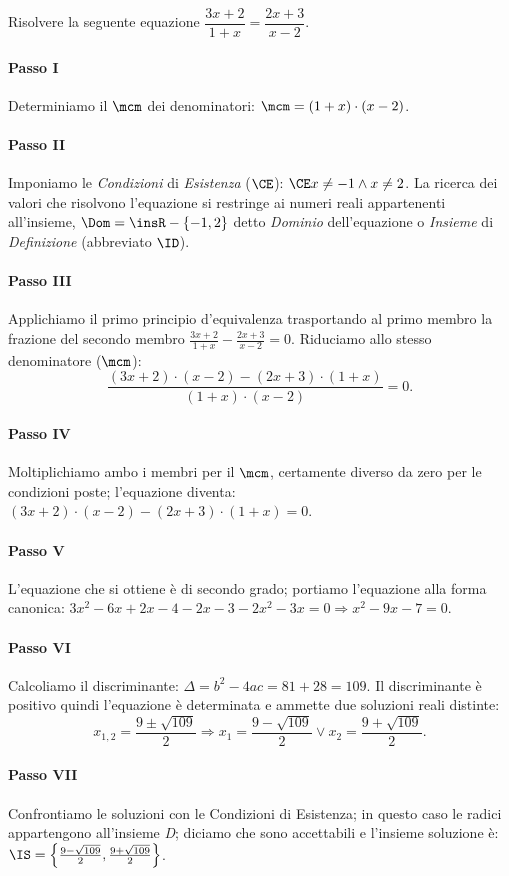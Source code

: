 \begin{esempio}
Risolvere la seguente equazione $\dfrac{3 x + 2}{1 + x}=\dfrac{2 x + 3}{x - 2}$.
 \paragraph{Passo I} Determiniamo il $\mcm$ dei denominatori: $\mcm = ( 1 + x ) 
\cdot ( x - 2 )$.
 \paragraph{Passo II} Imponiamo le \emph{Condizioni} di \emph{Esistenza} 
($\CE$): $\CE x \neq - 1 \wedge x \neq 2$. La ricerca dei valori che risolvono 
l'equazione si restringe ai numeri reali appartenenti all'insieme, $\Dom = 
\insR 
- \{- 1, 2 \}$ detto \emph{Dominio} dell'equazione o \emph{Insieme} di 
\emph{Definizione} (abbreviato $\ID$).
 \paragraph{Passo III} Applichiamo il primo principio d'equivalenza 
trasportando 
al primo membro la frazione del secondo membro $\frac{3 x + 2}{1 + x} - \frac{2 
x + 3}{x - 2} = 0$. Riduciamo allo stesso denominatore ($\mcm$): 
\[\frac{( 3 x + 2 ) \cdot ( x - 2 ) - ( 2 x + 3 ) \cdot ( 1 + x )}{( 1 +x ) 
\cdot ( x - 2 )}=0.\]
 \paragraph{Passo IV} Moltiplichiamo ambo i membri per il $\mcm$, certamente 
diverso da zero per le condizioni poste; l'equazione diventa: $( 3 x + 2 ) 
\cdot 
( x - 2 ) - ( 2 x + 3 ) \cdot ( 1 + x )=0$.
 \paragraph{Passo V} L'equazione che si ottiene è di secondo grado; portiamo 
l'equazione alla forma canonica: $3 x^{2} - 6 x + 2 x - 4 - 2 x - 3 - 2 x^{2} - 
3 x=0 \Rightarrow x^{2} - 9 x - 7=0$.
 \paragraph{Passo VI} Calcoliamo il discriminante: $\Delta=b^{2} - 4 a c=81 + 
28 
= 109$. Il discriminante è positivo quindi l'equazione è determinata e ammette 
due soluzioni reali distinte: 
\[x_{1,2}=\frac{9 \pm \sqrt{109}}{2} \Rightarrow x_{1}=\frac{9 - \sqrt{109}}{2} 
\vee x_{2}=\frac{9 + \sqrt{109}}{2}.\]
 \paragraph{Passo VII} Confrontiamo le soluzioni con le Condizioni di 
Esistenza; 
in questo caso le radici appartengono all'insieme \emph{D}; diciamo che sono 
accettabili e l'insieme soluzione è: $\IS=\left\{\frac{9 - \sqrt{109}}{2}, 
\frac{9 +\sqrt{109}}{2} \right\}$.
 \end{esempio}

